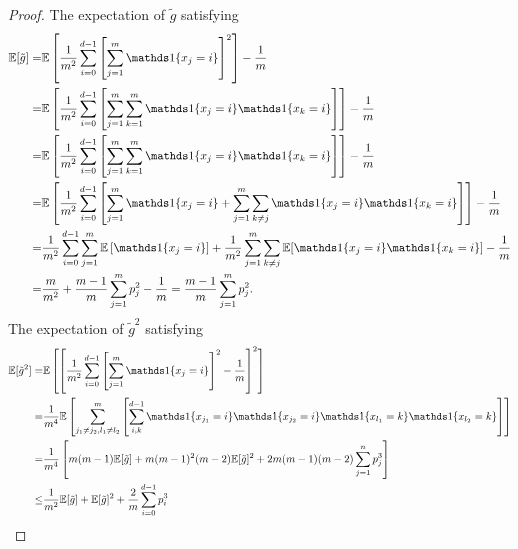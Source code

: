     \begin{proof}
        
    \label{proof: purity_collision_property}
    The expectation of $\tilde{g}$ satisfying
    \begin{equation}
        \begin{aligned}
            \mathbb{E} [\tilde{g}] = & \mathbb{E}\left[\frac{1}{m^2} \sum_{i=0}^{d-1} \left[ \sum_{j=1}^m \indicator\{x_j =i\}\right]^2\right] - \frac{1}{m}\\
            = & \mathbb{E}\left[\frac{1}{m^2} \sum_{i=0}^{d-1} \left[ \sum_{j=1}^m \sum_{k=1}^m \indicator\{x_j =i\}\indicator\{x_k =i\}\right]\right] - \frac{1}{m}\\
            = & \mathbb{E}\left[\frac{1}{m^2} \sum_{i=0}^{d-1} \left[ \sum_{j=1}^m \sum_{k=1}^m \indicator\{x_j =i\}\indicator\{x_k =i\}\right]\right] - \frac{1}{m}\\
            = & \mathbb{E}\left[\frac{1}{m^2} \sum_{i=0}^{d-1} \left[ \sum_{j=1}^m \indicator\{x_j =i\}+ \sum_{j=1}^m \sum_{k\neq j} \indicator\{x_j =i\}\indicator\{x_k =i\}\right]\right] - \frac{1}{m}\\
            = & \frac{1}{m^2} \sum_{i=0}^{d-1}  \sum_{j=1}^m \mathbb{E}\left[\indicator\{x_j =i\}\right]+ \frac{1}{m^2} \sum_{j=1}^m \sum_{k\neq j} \mathbb{E} [\indicator\{x_j =i\}\indicator\{x_k =i\}] - \frac{1}{m}\\
            = & \frac{m}{m^2} + \frac{m-1}{m} \sum_{j=1}^m p_j^2 - \frac{1}{m}
            = \frac{m-1}{m} \sum_{j=1}^m p_j^2.
        \end{aligned}
    \end{equation}
    The expectation of $\tilde{g}^2$ satisfying
    \begin{equation*}
        \begin{aligned}
            \mathbb{E} [\tilde{g}^2] = & \mathbb{E}\left[\left[\frac{1}{m^2}  \sum_{i=0}^{d-1}\left[ \sum_{j=1}^m \indicator\{x_j =i\}\right]^2 -\frac{1}{m}\right]^2\right] \\
            = & \frac{1}{m^4} \mathbb{E} \left[\sum_{j_1\neq j_2,l_1 \neq l_2}^m\left[\sum_{i,k}^{d-1} \indicator\{x_{j_1} =i\} \indicator\{x_{j_2} =i\} \indicator\{x_{l_1} =k\} \indicator\{x_{l_2} =k\}\right] \right]\\
            = & \frac{1}{m^4} \left[ m(m-1)\mathbb{E}[\tilde{g}] + m(m-1)^2(m-2)\mathbb{E}[\tilde{g}]^2 + 2m(m-1)(m-2)\sum_{j=1}^n p_j^3\right]\\
            \leq & \frac{1}{m^2} \mathbb{E}[\tilde{g}] + \mathbb{E}[\tilde{g}]^2+ \frac{2}{m} \sum_{i=0}^{d-1} p_i^3
        \end{aligned}
    \end{equation*}
    

\end{proof}
